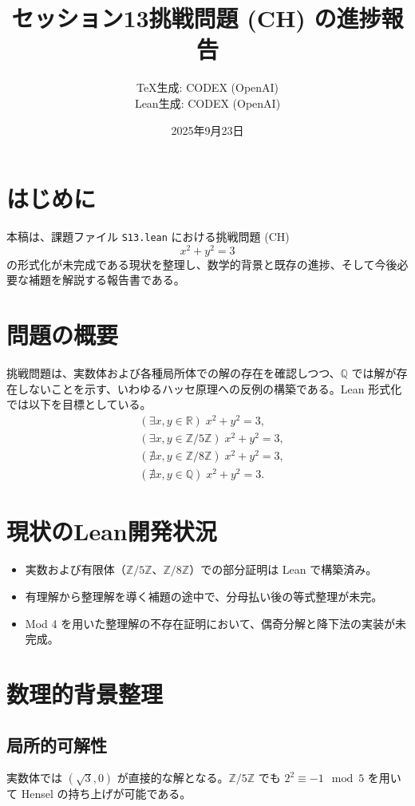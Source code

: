 \documentclass{ltjsarticle}
\title{セッション13挑戦問題 (CH) の進捗報告}
\author{TeX生成: CODEX (OpenAI)\\Lean生成: CODEX (OpenAI)}
\date{2025年9月23日}
\begin{document}
\maketitle

\section{はじめに}
本稿は、課題ファイル \texttt{S13.lean} における挑戦問題 (CH)
\[
 x^2 + y^2 = 3
\]
の形式化が未完成である現状を整理し、数学的背景と既存の進捗、そして今後必要な補題を解説する報告書である。

\section{問題の概要}
挑戦問題は、実数体および各種局所体での解の存在を確認しつつ、\( \mathbb{Q} \) では解が存在しないことを示す、いわゆるハッセ原理への反例の構築である。Lean 形式化では以下を目標としている。
\begin{align*}
  & (\exists x, y \in \mathbb{R})\; x^2 + y^2 = 3, \\
  & (\exists x, y \in \mathbb{Z}/5\mathbb{Z})\; x^2 + y^2 = 3, \\
  & (\nexists x, y \in \mathbb{Z}/8\mathbb{Z})\; x^2 + y^2 = 3, \\
  & (\nexists x, y \in \mathbb{Q})\; x^2 + y^2 = 3.
\end{align*}

\section{現状のLean開発状況}
\begin{itemize}
  \item 実数および有限体（\( \mathbb{Z}/5\mathbb{Z} \)、\( \mathbb{Z}/8\mathbb{Z} \)）での部分証明は Lean で構築済み。
  \item 有理解から整理解を導く補題の途中で、分母払い後の等式整理が未完。
  \item Mod 4 を用いた整理解の不存在証明において、偶奇分解と降下法の実装が未完成。
\end{itemize}

\section{数理的背景整理}
\subsection{局所的可解性}
実数体では \( (\sqrt{3}, 0) \) が直接的な解となる。\( \mathbb{Z}/5\mathbb{Z} \) でも \( 2^2 \equiv -1 \mod 5 \) を用いて Hensel の持ち上げが可能である。
\end{document}
